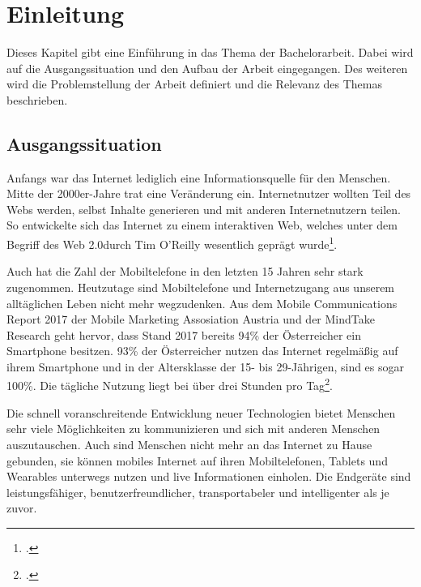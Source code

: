 


\chapter{Einleitung}
\label{ch:Einleitung}
Dieses Kapitel gibt eine Einführung in das Thema der Bachelorarbeit. Dabei wird auf die Ausgangssituation und den Aufbau der Arbeit eingegangen. Des weiteren wird die Problemstellung der Arbeit definiert und die Relevanz des Themas beschrieben.


\section{Ausgangssituation}

Anfangs war das Internet lediglich eine Informationsquelle für den Menschen. Mitte der 2000er-Jahre trat eine Veränderung ein. Internetnutzer wollten Teil des Webs werden, selbst Inhalte generieren und mit anderen Internetnutzern teilen. So entwickelte sich das Internet zu einem interaktiven Web, welches unter dem Begriff des \glqq Web 2.0\grqq  durch Tim O'Reilly wesentlich geprägt wurde\footcite{oreilly}.

Auch hat die Zahl der Mobiltelefone in den letzten 15 Jahren sehr stark zugenommen.
Heutzutage sind Mobiltelefone und Internetzugang aus unserem alltäglichen Leben nicht mehr wegzudenken. Aus dem Mobile Communications Report 2017 der Mobile Marketing Assosiation Austria und der MindTake Research geht hervor, dass Stand 2017 bereits 94\% der Österreicher ein Smartphone besitzen. 93\% der Österreicher nutzen das Internet regelmäßig auf ihrem Smartphone und in der Altersklasse der 15- bis 29-Jährigen, sind es sogar 100\%. Die tägliche Nutzung liegt bei über drei Stunden pro Tag\footcite{MMAA}.

Die schnell voranschreitende Entwicklung neuer Technologien bietet Menschen sehr viele Möglichkeiten zu kommunizieren und sich mit anderen Menschen auszutauschen. Auch sind Menschen nicht mehr an das Internet zu Hause gebunden, sie können mobiles Internet auf ihren Mobiltelefonen, Tablets und Wearables unterwegs nutzen und live Informationen einholen. Die Endgeräte sind leistungsfähiger, benutzerfreundlicher, transportabeler und intelligenter als je zuvor.

